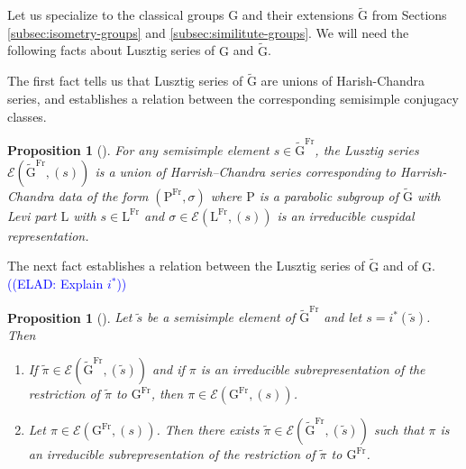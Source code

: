 \documentclass[12pt, reqno]{amsart}
\newtheorem{proposition}[theorem]{Proposition}
\theoremstyle{definition}
\theoremstyle{definition}
\theoremstyle{definition}
\newcommand{\GroupExtension}[1]{\widetilde{#1}}
\newcommand{\Frobenius}{\operatorname{Fr}}
\newcommand{\algebraicGroup}[1]{\boldsymbol{\mathrm{#1}}}
\newcommand{\LusztigSeries}[2]{\mathcal{E}\left(#1, (#2)\right)}
\newcommand{\FrobeniusFixedPoints}[2][\Frobenius]{\algebraicGroup{#2}^{#1}}
\newcommand{\elad}[1]{\textcolor{blue}{\sffamily ((ELAD: #1))}}
\begin{document}
Let us specialize to the classical groups $\algebraicGroup{G}$ and their extensions $\GroupExtension{\algebraicGroup{G}}$ from Sections \ref{subsec:isometry-groups} and \ref{subsec:similitute-groups}. We will need the following facts about Lusztig series of $\algebraicGroup{G}$ and $\GroupExtension{\algebraicGroup{G}}$. 

The first fact tells us that Lusztig series of $\GroupExtension{\algebraicGroup{G}}$ are unions of Harish-Chandra series, and establishes a relation between the corresponding semisimple conjugacy classes.
\begin{proposition}[{\cite[Proof of Corollary 3.3.21]{GeckMalle2020}}]\label{prop:lusztig-series-are-unions-of-harish-chandra-series}
	For any semisimple element $s \in \FrobeniusFixedPoints{\GroupExtension{G}}$, the Lusztig series $\LusztigSeries{\FrobeniusFixedPoints{\GroupExtension{G}}}{s}$ is a union of Harrish--Chandra series corresponding to Harrish-Chandra data of the form $\left(\FrobeniusFixedPoints{\algebraicGroup{P}},\sigma\right)$ where $\algebraicGroup{P}$ is a parabolic subgroup of $\algebraicGroup{\GroupExtension{G}}$ with Levi part $\algebraicGroup{L}$ with $s \in \FrobeniusFixedPoints{L}$ and $\sigma \in \LusztigSeries{\FrobeniusFixedPoints{L}}{s}$ is an irreducible cuspidal representation.
\end{proposition}

The next fact establishes a relation between the Lusztig series of $\GroupExtension{\algebraicGroup{G}}$ and of $\algebraicGroup{G}$.
\elad{Explain $i^{\ast}$}

\begin{proposition}[{\cite[Proposition 11.7]{Bonnafe2006}}]\label{prop:lusztig-series-and-restriction}
	Let $\tilde{s}$ be a semisimple element of $\FrobeniusFixedPoints{\GroupExtension{G}}$ and let $s = i^{\ast}\left(\tilde{s}\right)$. Then
	\begin{enumerate}
		\item If $\tilde{\pi} \in \LusztigSeries{\FrobeniusFixedPoints{\GroupExtension{G}}}{\tilde{s}}$ and if $\pi$ is an irreducible subrepresentation of the restriction of $\tilde{\pi}$ to $\FrobeniusFixedPoints{G}$, then $\pi \in \LusztigSeries{\FrobeniusFixedPoints{G}}{s}$.
		\item Let $\pi \in \LusztigSeries{\FrobeniusFixedPoints{G}}{s}$. Then there exists $\tilde{\pi} \in \LusztigSeries{\FrobeniusFixedPoints{\GroupExtension{G}}}{\tilde{s}}$ such that $\pi$ is an irreducible subrepresentation of the restriction of $\tilde{\pi}$ to $\FrobeniusFixedPoints{G}$.
	\end{enumerate}
\end{proposition}
\end{document}
